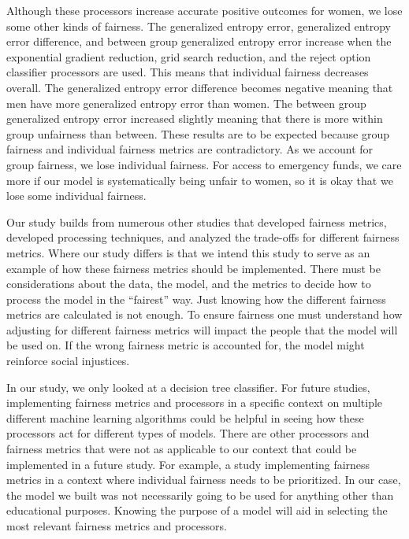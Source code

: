 \documentclass[water,article,submit,moreauthors,pdftex]{mdpi}
\begin{document}
Although these processors increase accurate positive outcomes for women,
we lose some other kinds of fairness. The generalized entropy error,
generalized entropy error difference, and between group generalized
entropy error increase when the exponential gradient reduction, grid
search reduction, and the reject option classifier processors are used.
This means that individual fairness decreases overall. The generalized
entropy error difference becomes negative meaning that men have more
generalized entropy error than women. The between group generalized
entropy error increased slightly meaning that there is more within group
unfairness than between. These results are to be expected because group
fairness and individual fairness metrics are contradictory. As we
account for group fairness, we lose individual fairness. For access to
emergency funds, we care more if our model is systematically being
unfair to women, so it is okay that we lose some individual fairness.

Our study builds from numerous other studies that developed fairness
metrics\citep{speicher2018unified, wachter2021fairness}, developed
processing
techniques\citep{agarwal2018reductions, kamiran2012data, agarwal2019fair, pleiss2017fairness},
and analyzed the trade-offs for different fairness
metrics\citep{speicher2018unified}. Where our study differs is that we
intend this study to serve as an example of how these fairness metrics
should be implemented. There must be considerations about the data, the
model, and the metrics to decide how to process the model in the
``fairest'' way. Just knowing how the different fairness metrics are
calculated is not enough. To ensure fairness one must understand how
adjusting for different fairness metrics will impact the people that the
model will be used on. If the wrong fairness metric is accounted for,
the model might reinforce social injustices.

In our study, we only looked at a decision tree classifier. For future
studies, implementing fairness metrics and processors in a specific
context on multiple different machine learning algorithms could be
helpful in seeing how these processors act for different types of
models. There are other processors and fairness metrics that were not as
applicable to our context that could be implemented in a future study.
For example, a study implementing fairness metrics in a context where
individual fairness needs to be prioritized. In our case, the model we
built was not necessarily going to be used for anything other than
educational purposes. Knowing the purpose of a model will aid in
selecting the most relevant fairness metrics and processors.
\end{document}
